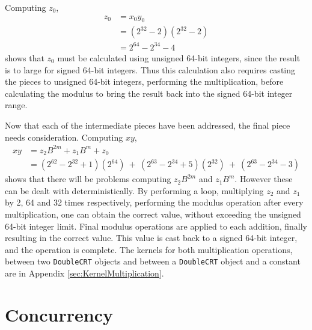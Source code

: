 Computing $z_0$,
\begin{equation}
\begin{split}
z_0 & = x_0 y_0\\
 & = (2^{32} - 2) (2^{32} - 2)\\
 & = 2^{64} - 2^{34} - 4
\end{split}
\end{equation}
shows that $z_0$ must be calculated using unsigned 64-bit integers, since the result is to large for signed 64-bit integers. Thus this calculation also requires casting the pieces to unsigned 64-bit integers, performing the multiplication, before calculating the modulus to bring the result back into the signed 64-bit integer range.

Now that each of the intermediate pieces have been addressed, the final piece needs consideration. Computing $xy$,
\begin{equation}
\begin{split}
xy & = z_2 B^{2m} + z_1 B^{m} + z_0\\
 & = (2^{62} - 2^{32} + 1) (2^{64})\ +\ (2^{63} - 2^{34} + 5) (2^{32})\ +\ (2^{63} - 2^{34} - 3)
\end{split}
\end{equation}
shows that there will be problems computing $z_2 B^{2m}$ and $z_1 B^{m}$. However these can be dealt with deterministically. By performing a loop, multiplying $z_2$ and $z_1$ by 2, 64 and 32 times respectively, performing the modulus operation after every multiplication, one can obtain the correct value, without exceeding the unsigned 64-bit integer limit. Final modulus operations are applied to each addition, finally resulting in the correct value. This value is cast back to a signed 64-bit integer, and the operation is complete. The kernels for both multiplication operations, between two \verb|DoubleCRT| objects and between a \verb|DoubleCRT| object and a constant are in Appendix \ref{sec:KernelMultiplication}.

\section{Concurrency}